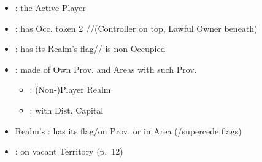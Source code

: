 \documentclass[10pt]{article}
\begin{document}
\begin{itemize}
	\item {}: the Active Player
	\item {}: has Occ. token  2 \rebeltown/\town/\vassal (Controller on top, Lawful Owner beneath)
	\item {}: has its Realm's flag/\town/\dnpr {} is non-Occupied
	\item {}: made of Own Prov. and Areas with such Prov.
	\begin{itemize}
		\item {}: (Non-)Player Realm
		\item {}: with Dist. Capital
	\end{itemize}
	\item Realm's : has its flag/\dnpr on Prov. or \core in Area (\core/\dnpr supercede flags)
	\item {}: \claim on vacant Territory (p.~12)
\end{itemize}
\end{document}
